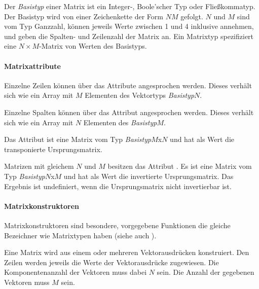 Der \emph{Basistyp} einer Matrix ist ein Integer-, Boole'scher Typ oder Fließkommatyp.
Der Basistyp wird von einer Zeichenkette der Form $N$$M$ gefolgt. $N$ und
$M$ sind vom Typ Ganzzahl, können jeweils Werte zwischen 1 und 4 inklusive annehmen,
und geben die Spalten- und Zeilenzahl
der Matrix an. Ein Matrixtyp spezifiziert eine  $N \times M$-Matrix von Werten des Basistyps.

\paragraph{Matrixattribute}\label{Matrixattribute}

Einzelne Zeilen können über das Attribute  angesprochen werden. Dieses
verhält sich wie ein Array mit $M$ Elementen des Vektortyps \emph{Basistyp}$N$.

Einzelne Spalten können über das Attribut  angesprochen werden. Dieses
verhält sich wie ein Array mit $N$ Elementen des \emph{Basistyp}$M$.

Das Attribut  ist eine Matrix vom Typ \emph{Basistyp}$M$x$N$
und hat als Wert die transponierte Ursprungsmatrix.

Matrizen mit gleichem $N$ und $M$ besitzen das Attribut .
Es ist eine Matrix vom Typ \emph{Basistyp}$N$x$M$ und hat als Wert die invertierte Ursprungsmatrix.
Das Ergebnis ist undefiniert, wenn die Ursprungsmatrix nicht invertierbar ist.

\paragraph{Matrixkonstruktoren}\label{Matrixkonstruktoren}

Matrixkonstruktoren sind besondere, vorgegebene Funktionen die gleiche Bezeichner wie Matrixtypen haben
(siehe auch ).


Eine Matrix wird aus einem oder mehreren Vektorausdrücken konstruiert. Den Zeilen werden
jeweils die Werte der Vektorausdrücke zugewiesen. Die Komponentenanzahl der Vektoren muss dabei
$N$ sein. Die Anzahl der gegebenen Vektoren muss $M$ sein.

